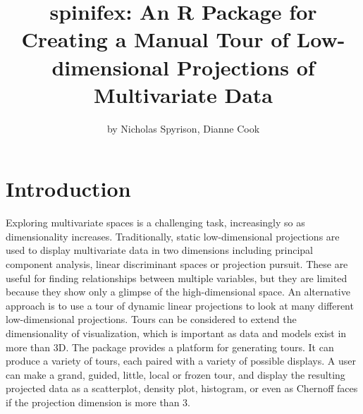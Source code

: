 \title{spinifex: An R Package for Creating a Manual Tour of Low-dimensional
Projections of Multivariate Data}
\author{by Nicholas Spyrison, Dianne Cook}

\maketitle


\hypertarget{introduction}{%
\section{Introduction}\label{introduction}}

Exploring multivariate spaces is a challenging task, increasingly so as
dimensionality increases. Traditionally, static low-dimensional
projections are used to display multivariate data in two dimensions
including principal component analysis, linear discriminant spaces or
projection pursuit. These are useful for finding relationships between
multiple variables, but they are limited because they show only a
glimpse of the high-dimensional space. An alternative approach is to use
a tour \citep{asimov_grand_1985} of dynamic linear projections to look
at many different low-dimensional projections. Tours can be considered
to extend the dimensionality of visualization, which is important as
data and models exist in more than 3D. The package 
\citep{wickham_tourr:_2011} provides a platform for generating tours. It
can produce a variety of tours, each paired with a variety of possible
displays. A user can make a grand, guided, little, local or frozen tour,
and display the resulting projected data as a scatterplot, density plot,
histogram, or even as Chernoff faces if the projection dimension is more
than 3.

